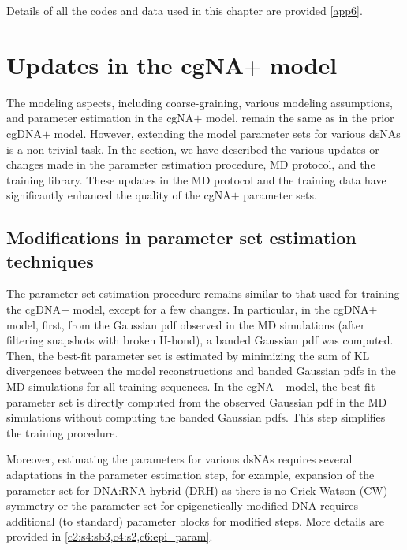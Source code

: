 Details of all the codes and data used in this chapter are provided \cref{app6}. \clearpage

\section{Updates in the cgNA$+$ model}\label{c4:s1}
The modeling aspects, including coarse-graining, various modeling assumptions, and parameter estimation in the cgNA$+$ model, remain the same as in the prior cgDNA$+$ model.
However, extending the model parameter sets for various dsNAs is a non-trivial task.
In the section, we have described the various updates or changes made in the parameter estimation procedure, MD protocol, and the training library.
These updates in the MD protocol and the training data have significantly enhanced the quality of the cgNA$+$ parameter sets.

\subsection{Modifications in parameter set estimation techniques}
The parameter set estimation procedure remains similar to that used for training the cgDNA$+$ model, except for a few changes.
In particular, in the cgDNA$+$ model, first, from the Gaussian pdf observed in the MD simulations (after filtering snapshots with broken H-bond), a banded Gaussian pdf was computed.
Then, the best-fit parameter set is estimated by minimizing the sum of KL divergences between the model reconstructions and banded Gaussian pdfs in the MD simulations for all training sequences.
In the cgNA$+$ model, the best-fit parameter set is directly computed from the observed Gaussian pdf in the MD simulations without computing the banded Gaussian pdfs.
This step simplifies the training procedure.

Moreover, estimating the parameters for various dsNAs requires several adaptations in the parameter estimation step, for example, expansion of the parameter set for DNA:RNA hybrid (DRH) as there is no Crick-Watson (CW) symmetry or the parameter set for epigenetically modified DNA requires additional (to standard) parameter blocks for modified steps.
More details are provided in \cref{c2:s4:sb3,c4:s2,c6:epi_param}.

